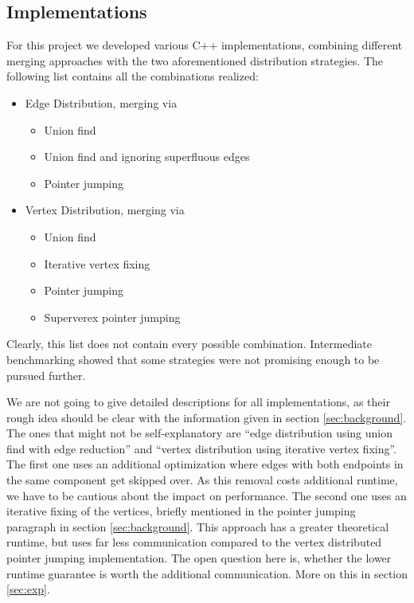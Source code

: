 \documentclass[letterpaper]{article}
\begin{document}
\subsection{Implementations}
\label{sec:implementations}
For this project we developed various C++ implementations, combining different merging approaches with the two
aforementioned distribution strategies. The following list contains all the combinations realized:
\begin{itemize}
  \item Edge Distribution, merging via
  \begin{itemize}
     \item Union find 
     \item Union find and ignoring superfluous edges
     \item Pointer jumping
  \end{itemize}
  \item Vertex Distribution, merging via
  \begin{itemize}
     \item Union find 
     \item Iterative vertex fixing
     \item Pointer jumping
     \item Superverex pointer jumping
  \end{itemize}
\end{itemize}
Clearly, this list does not contain every possible combination. Intermediate benchmarking showed that some strategies
were not promising enough to be pursued further.

We are not going to give detailed descriptions for all implementations, as their rough idea should be clear with the
information given in section \ref{sec:background}. The ones that might not be self-explanatory are ``edge distribution
using union find with edge reduction'' and ``vertex distribution using iterative vertex fixing''. The first one uses an
additional optimization where edges with both endpoints in the same component get skipped over. As this removal costs
additional runtime, we have to be cautious about the impact on performance. The second one uses an iterative fixing of
the vertices, briefly mentioned in the pointer jumping paragraph in section \ref{sec:background}. This approach has a
greater theoretical runtime, but uses far less communication compared to the vertex distributed pointer jumping
implementation. The open question here is, whether the lower runtime guarantee is worth the additional communication.
More on this in section \ref{sec:exp}. %
\end{document}
